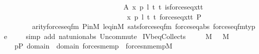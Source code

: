 \begin{isabellebody}
\ \ \ \ \ \ \ \ \ \ \ \ \ \ \ \ \ \ \ \ \ \ \ \ \ \ \ \ \ \ \ \ \ \ {\isachardoublequoteopen}{\isasymlambda}A\ x\ p\ l\ t{}\ t{}{\isachardot}{\kern0pt}\ is{\isacharunderscore}{\kern0pt}forces{\isacharunderscore}{\kern0pt}eq{\isacharparenleft}{\kern0pt}x{\isacharcomma}{\kern0pt}t{}{\isacharcomma}{\kern0pt}t{}{\isacharparenright}{\kern0pt}{\isachardoublequoteclose}\isanewline
\ \ \ \ \ \ \ \ \ \ \ \ \ \ \ \ \ \ \ \ \ \ \ \ \ \ \ \ \ \ \ \ \ \ {\isachardoublequoteopen}{\isasymlambda}\ x\ p\ l\ t{}\ t{}{\isachardot}{\kern0pt}\ forces{\isacharunderscore}{\kern0pt}eq{\isacharparenleft}{\kern0pt}x{\isacharcomma}{\kern0pt}t{}{\isacharcomma}{\kern0pt}t{}{\isacharparenright}{\kern0pt}{\isachardoublequoteclose}\ P{\isacharbrackright}{\kern0pt}\ \isanewline
\ \ \ \ \ \ \ \ arity{\isacharunderscore}{\kern0pt}forces{\isacharunderscore}{\kern0pt}eq{\isacharunderscore}{\kern0pt}fm\ P{\isacharunderscore}{\kern0pt}in{\isacharunderscore}{\kern0pt}M\ leq{\isacharunderscore}{\kern0pt}in{\isacharunderscore}{\kern0pt}M\ sats{\isacharunderscore}{\kern0pt}forces{\isacharunderscore}{\kern0pt}eq{\isacharunderscore}{\kern0pt}fm\ forces{\isacharunderscore}{\kern0pt}eq{\isacharunderscore}{\kern0pt}abs\ forces{\isacharunderscore}{\kern0pt}eq{\isacharunderscore}{\kern0pt}fm{\isacharunderscore}{\kern0pt}type\ \isanewline
\ \ \isamarkupfalse%
\ {\isacharparenleft}{\kern0pt}simp\ add{\isacharcolon}{\kern0pt}\ nat{\isacharunderscore}{\kern0pt}union{\isacharunderscore}{\kern0pt}abs{}\ Un{\isacharunderscore}{\kern0pt}commute{\isacharparenright}{\kern0pt}%
\endisatagproof
{\isafoldproof}%
%
\isadelimproof
\isanewline
%
\endisadelimproof
\isanewline
{}\isamarkupfalse%
\ IV{}{}{}b{\isacharunderscore}{\kern0pt}eq{\isacharunderscore}{\kern0pt}Collects{\isacharcolon}{\kern0pt}\isanewline
\ \ \ {\isachardoublequoteopen}{\isasymtau}\ {\isasymin}\ M{\isachardoublequoteclose}\ {\isachardoublequoteopen}{\isasymtheta}\ {\isasymin}\ M{\isachardoublequoteclose}\isanewline
\ \ \ {\isachardoublequoteopen}{\isacharbraceleft}{\kern0pt}p{\isasymin}P{\isachardot}{\kern0pt}\ {\isasymexists}{\isasymsigma}{\isasymin}domain{\isacharparenleft}{\kern0pt}{\isasymtau}{\isacharparenright}{\kern0pt}\ {\isasymunion}\ domain{\isacharparenleft}{\kern0pt}{\isasymtheta}{\isacharparenright}{\kern0pt}{\isachardot}{\kern0pt}\ forces{\isacharunderscore}{\kern0pt}mem{\isacharparenleft}{\kern0pt}p{\isacharcomma}{\kern0pt}{\isasymsigma}{\isacharcomma}{\kern0pt}{\isasymtau}{\isacharparenright}{\kern0pt}\ {\isasymand}\ forces{\isacharunderscore}{\kern0pt}nmem{\isacharparenleft}{\kern0pt}p{\isacharcomma}{\kern0pt}{\isasymsigma}{\isacharcomma}{\kern0pt}{\isasymtheta}{\isacharparenright}{\kern0pt}{\isacharbraceright}{\kern0pt}{\isasymin}M{\isachardoublequoteclose}\ \isanewline

\end{isabellebody}
